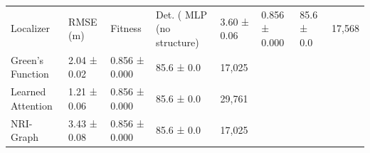 \begin{tabular}{lllll}
\toprule
Localizer & RMSE (m) & Fitness & Det. (%
\midrule
MLP (no structure) & 3.60 ± 0.06 & 0.856 ± 0.000 & 85.6 ± 0.0 & 17,568 \\
Green's Function & 2.04 ± 0.02 & 0.856 ± 0.000 & 85.6 ± 0.0 & 17,025 \\
Learned Attention & 1.21 ± 0.06 & 0.856 ± 0.000 & 85.6 ± 0.0 & 29,761 \\
NRI-Graph & 3.43 ± 0.08 & 0.856 ± 0.000 & 85.6 ± 0.0 & 17,025 \\
\bottomrule
\end{tabular}
